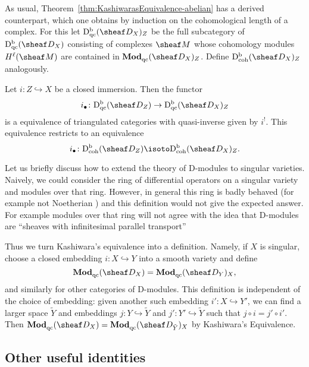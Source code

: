 \documentclass[number-in-sections,a4paper]{notes}
\begin{document}
As usual, Theorem~\ref{thm:KashiwarasEquivalence-abelian} has a derived counterpart, which one obtains by induction on the cohomological length of a complex.
For this let $\catDbDModqc{X}_Z$ be the full subcategory of $\catDbDModqc{X}$ consisting of complexes $\sheaf M$ whose cohomology modules $H^\ell(\sheaf M)$ are contained in $\catDModqc{X}_Z$.
Define $\catDbDModcoh{X}_Z$ analogously.

\begin{Corollary}\label{thm:KashiwarasEquivalence-derived}
    Let $i\colon Z \hookrightarrow X$ be a closed immersion.
    Then the functor 
    \[
        i_\bullet \colon \catDbDModqc{Z} \to \catDbDModqc{X}_Z
    \]
    is a equivalence of triangulated categories with quasi-inverse given by $i^!$.
    This equivalence restricts to an equivalence
    \[
        i_\bullet \colon \catDbDModcoh{Z} \isoto \catDbDModcoh{X}_Z.
    \]
\end{Corollary}

\begin{Remark}
    Let us briefly discuss how to extend the theory of D-modules to singular varieties.
    Naively, we could consider the ring of differential operators on a singular variety and modules over that ring.
    However, in general this ring is badly behaved (for example not Noetherian \cite{BernsteinGelfandGelfand:1972:DifferentialOperatorsOnACubicCone}) and this definition would not give the expected answer.
    For example modules over that ring will not agree with the idea that D-modules are \enquote{sheaves with infinitesimal parallel transport}
    
    Thus we turn Kashiwara's equivalence into a definition.
    Namely, if $X$ is singular, choose a closed embedding $i\colon X \hookrightarrow Y$ into a smooth variety and define
    \[
        \catDModqc{X} = \catDModqc{Y}_X,
    \]
    and similarly for other categories of D-modules.
    This definition is independent of the choice of embedding: given another such embedding $i'\colon X \hookrightarrow Y'$, we can find a larger space $\tilde Y$ and embeddings $j\colon Y \hookrightarrow \tilde Y$ and $j'\colon Y' \hookrightarrow \tilde Y$ such that $j \circ i = j' \circ i'$.
    Then $\catDModqc{X} = \catDModqc{\tilde Y}_X$ by Kashiwara's Equivalence.
\end{Remark}

\subsection{Other useful identities}
\end{document}
